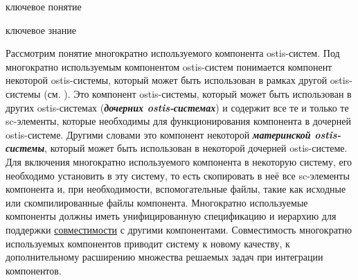 \begin{SCn}
	\begin{scnrelfromlist}{ключевое понятие}
	\end{scnrelfromlist}
\end{SCn}

\bigskip

\begin{SCn}
	\begin{scnrelfromlist}{ключевое знание}
	\end{scnrelfromlist}
\end{SCn}

Рассмотрим понятие многократно используемого компонента ostis-систем. Под многократно используемым компонентом ostis-систем понимается  компонент некоторой ostis-системы, который может быть использован в рамках другой ostis-системы (см. ). Это компонент ostis-системы, который может быть использован в других ostis-системах (\textbf{\textit{дочерних ostis-системах}}) и содержит все те и только те sc-элементы, которые необходимы для функционирования компонента в дочерней ostis-системе. Другими словами это компонент некоторой \textbf{\textit{материнской ostis-системы}}, который может быть использован в некоторой дочерней ostis-системе. Для включения многократно используемого компонента в некоторую систему, его необходимо установить в эту систему, то есть скопировать в неё все sc-элементы компонента и, при необходимости, вспомогательные файлы, такие как исходные или скомпилированные файлы компонента. Многократно используемые компоненты должны иметь унифицированную спецификацию и иерархию для поддержки \underline{совместимости} с другими компонентами. Совместимость многократно используемых компонентов приводит систему к новому качеству, к дополнительному расширению множества решаемых задач при интеграции компонентов.

\begin{SCn}
\end{SCn}

